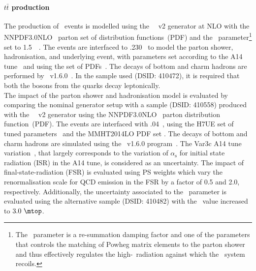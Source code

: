 \paragraph{$t\bar{t}$ production} 
The production of \ttbar\ events is modelled using the
\powhegbox~\cite{Frixione:2007nw,Nason:2004rx,Frixione:2007vw,Alioli:2010xd}~v2
generator at NLO with the NNPDF3.0NLO~\cite{Ball:2014uwa} parton set
of distribution functions~(PDF) and the \hdamp\ parameter\footnote{The
	\hdamp\ parameter is a re-summation damping factor and one of the
	parameters that controls the matching of Powheg matrix elements to
	the parton shower and thus effectively regulates the
	high-\pt\ radiation against which the \ttbar\ system recoils.} set
to 1.5~\mtop~\cite{ATL-PHYS-PUB-2016-020}.  The events are interfaced
to \pythia.230~\cite{Sjostrand:2014zea} to model the parton shower,
hadronisation, and underlying event, with parameters set according
to the A14 tune~\cite{ATL-PHYS-PUB-2014-021} and using the \nnpdftwo
set of PDFs~\cite{Ball:2012cx}. The decays of bottom and charm hadrons
are performed by \mbox{\evtgen~v1.6.0~\cite{EvtGen}.}
In the sample used (DSID\@: 410472), it is required that both the \PW bosons from the \Pqt quarks decay leptonically.\\
The impact of the parton shower and hadronisation model is evaluated
by comparing the nominal generator setup with a sample (DSID\@: 410558) produced with
the
\powhegbox~\cite{Frixione:2007nw,Nason:2004rx,Frixione:2007vw,Alioli:2010xd}~v2
generator using the NNPDF3.0NLO~\cite{Ball:2014uwa} parton
distribution function~(PDF). The events are interfaced with
\herwigseven.04~\cite{Bahr:2008pv,Bellm:2015jjp}, using the H7UE set
of tuned parameters~\cite{Bellm:2015jjp} and the MMHT2014LO PDF set
\cite{Harland-Lang:2014zoa}.
The decays of bottom and charm hadrons
are simulated using the \evtgen\ v1.6.0 program~\cite{EvtGen}. 
The Var3c A14 tune variation~\cite{ATL-PHYS-PUB-2014-021}, that largely corresponds to the variation of
$\alpha_{\textrm{s}}$ for initial state radiation (ISR) in the A14
tune, is considered as an uncertainty. The impact of final-state-radiation (FSR) is evaluated using PS
weights which vary the renormalisation scale for QCD emission in the
FSR by a factor of 0.5 and 2.0, respectively.
Additionally, the uncertainty associated to the \hdamp\ parameter is evaluated using the
alternative sample (DSID\@: 410482) with the \hdamp\ value increased to $3.0~\mtop$. 

